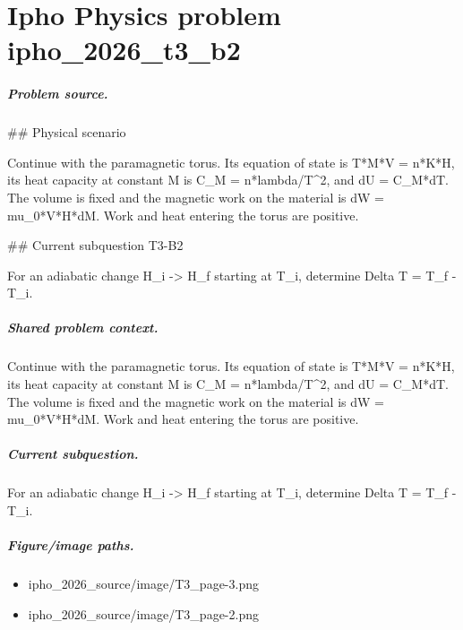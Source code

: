 
\chapter{Ipho Physics problem ipho\_2026\_t3\_b2}
\label{ch:IPhO2026Problems_problem_ipho_2026_t3_b2}

\paragraph{Problem source.}
\#\# Physical scenario

Continue with the paramagnetic torus.  Its equation of state is T*M*V = n*K*H,
its heat capacity at constant M is C\_M = n*lambda/T\textasciicircum{}2, and dU = C\_M*dT.
The volume is fixed and the magnetic work on the material is
dW = mu\_0*V*H*dM.  Work and heat entering the torus are positive.

\#\# Current subquestion T3-B2

For an adiabatic change H\_i -> H\_f starting at T\_i, determine Delta T = T\_f - T\_i.

\paragraph{Shared problem context.}
Continue with the paramagnetic torus.  Its equation of state is T*M*V = n*K*H,
its heat capacity at constant M is C\_M = n*lambda/T\textasciicircum{}2, and dU = C\_M*dT.
The volume is fixed and the magnetic work on the material is
dW = mu\_0*V*H*dM.  Work and heat entering the torus are positive.

\paragraph{Current subquestion.}
For an adiabatic change H\_i -> H\_f starting at T\_i, determine Delta T = T\_f - T\_i.

\paragraph{Figure/image paths.}
\begin{itemize}
\item ipho\_2026\_source/image/T3\_page-3.png
\item ipho\_2026\_source/image/T3\_page-2.png
\end{itemize}

